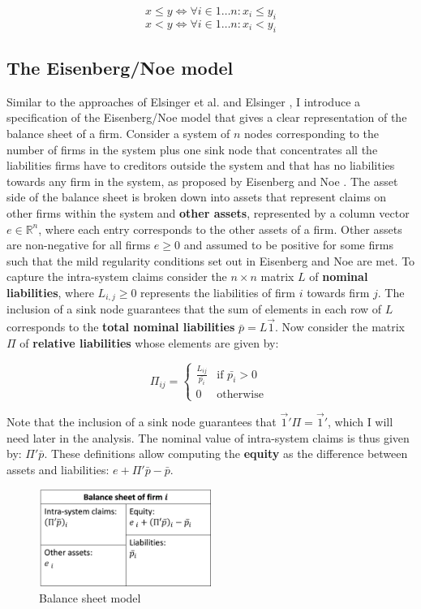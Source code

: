 \documentclass[12pt,a4paper]{article}
\begin{document}
\[ x \le y \Leftrightarrow \forall i \in 1 \dots n \colon x_i \le y_i \]
\[ x < y \Leftrightarrow \forall i \in 1 \dots n \colon x_i < y_i \]

\subsection{The Eisenberg/Noe model}
Similar to the approaches of Elsinger et al. \cite{Elsinger2006} and Elsinger \cite{Elsinger2009}, I introduce a specification of the Eisenberg/Noe \cite{Eisenberg2001} model that gives a clear representation of the balance sheet of a firm. Consider a system of $n$ nodes corresponding to the number of firms in the system plus one sink node that concentrates all the liabilities firms have to creditors outside the system and that has no liabilities towards any firm in the system, as proposed by Eisenberg and Noe \cite{Eisenberg2001}. The asset side of the balance sheet is broken down into assets that represent claims on other firms within the system and \textbf{other assets}, represented by a column vector $e \in \mathbb{R}^n$, where each entry corresponds to the other assets of a firm. Other assets are non-negative for all firms $e \ge 0$ and assumed to be positive for some firms such that the mild regularity conditions set out in Eisenberg and Noe \cite{Eisenberg2001} are met. To capture the intra-system claims consider the $n \times n$ matrix $L$ of \textbf{nominal liabilities}, where $L_{i,j} \ge 0$ represents the liabilities of firm $i$ towards firm $j$. The inclusion of a sink node guarantees that the sum of elements in each row of $L$ corresponds to the \textbf{total nominal liabilities} $\bar{p}=L \vec{1}$. Now consider the matrix $\Pi$ of \textbf{relative liabilities} whose elements are given by: 

\[
\Pi_{ij} = \begin{cases} 
\frac{L_{ij}}{\bar{p_i}} &\mbox{if } \bar{p_i} > 0 \\ 
0 & \mbox{otherwise } \end{cases}
\]

Note that the inclusion of a sink node guarantees that $\vec{1}' \Pi =\vec{1}'$, which I will need later in the analysis. The nominal value of intra-system claims is thus given by: $\Pi' \bar{p}$. These definitions allow computing the \textbf{equity} as the difference between assets and liabilities: $e+\Pi' \bar{p}-\bar{p}$.

\begin{figure}[H]
\centering
\includegraphics[width=0.5\textwidth]{BalanceSheet.png}
\caption{\label{fig:BalanceSheet}Balance sheet model}
\end{figure}
\end{document}
